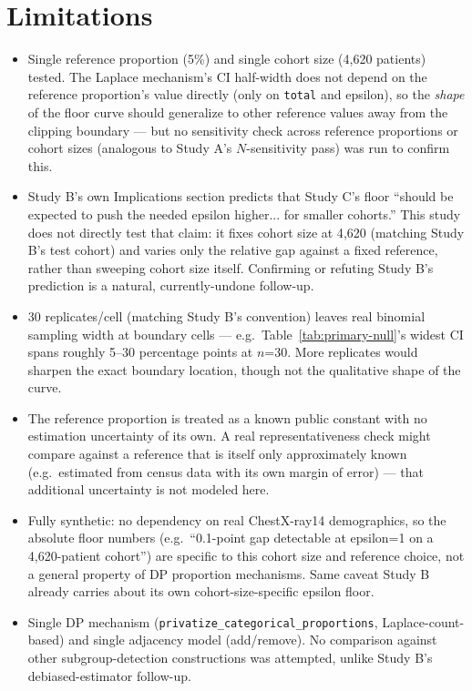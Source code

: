 \documentclass[11pt]{article}
\begin{document}
\section{Limitations}
\begin{itemize}
\item Single reference proportion (5\%) and single cohort size (4{,}620 patients) tested. The Laplace mechanism's CI half-width does not depend on the reference proportion's value directly (only on \texttt{total} and epsilon), so the \emph{shape} of the floor curve should generalize to other reference values away from the clipping boundary --- but no sensitivity check across reference proportions or cohort sizes (analogous to Study A's $N$-sensitivity pass) was run to confirm this.
\item Study B's own Implications section predicts that Study C's floor ``should be expected to push the needed epsilon higher... for smaller cohorts.'' This study does not directly test that claim: it fixes cohort size at 4{,}620 (matching Study B's test cohort) and varies only the relative gap against a fixed reference, rather than sweeping cohort size itself. Confirming or refuting Study B's prediction is a natural, currently-undone follow-up.
\item 30 replicates/cell (matching Study B's convention) leaves real binomial sampling width at boundary cells --- e.g.\ Table~\ref{tab:primary-null}'s widest CI spans roughly 5--30 percentage points at $n$=30. More replicates would sharpen the exact boundary location, though not the qualitative shape of the curve.
\item The reference proportion is treated as a known public constant with no estimation uncertainty of its own. A real representativeness check might compare against a reference that is itself only approximately known (e.g.\ estimated from census data with its own margin of error) --- that additional uncertainty is not modeled here.
\item Fully synthetic: no dependency on real ChestX-ray14 demographics, so the absolute floor numbers (e.g.\ ``0.1-point gap detectable at epsilon=1 on a 4,620-patient cohort'') are specific to this cohort size and reference choice, not a general property of DP proportion mechanisms. Same caveat Study B already carries about its own cohort-size-specific epsilon floor.
\item Single DP mechanism (\texttt{privatize\_categorical\_proportions}, Laplace-count-based) and single adjacency model (add/remove). No comparison against other subgroup-detection constructions was attempted, unlike Study B's debiased-estimator follow-up.
\end{itemize}
\end{document}
